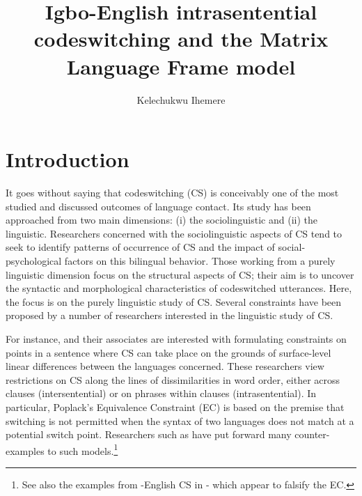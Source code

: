 \documentclass[output=paper]{langsci/langscibook}
\title{Igbo-English intrasentential codeswitching and the Matrix Language Frame model}
\author{%
 Kelechukwu Ihemere \affiliation{University of Westminster, London UK}
}
\begin{document}



 


\section{Introduction}\label{sec:ihemere:1}

It goes without saying that codeswitching (CS) is conceivably one of the most studied and discussed outcomes of language contact. Its study has been approached from two main dimensions: (i) the sociolinguistic and (ii) the linguistic. Researchers concerned with the sociolinguistic aspects of CS tend to seek to identify patterns of occurrence of CS and the impact of social-psychological factors on this bilingual behavior. Those working from a purely linguistic dimension focus on the structural aspects of CS; their aim is to uncover the syntactic and morphological characteristics of codeswitched utterances. Here, the focus is on the purely linguistic study of CS. Several constraints have been proposed by a number of researchers interested in the linguistic study of CS.  

For instance, \citet{PoplackMeechan1998} and their associates are interested with formulating constraints on points in a sentence where CS can take place on the grounds of surface-level linear differences between the languages concerned. These researchers view restrictions on CS along the lines of dissimilarities in word order, either across clauses (intersentential) or on phrases within clauses (intrasentential). In particular, Poplack’s Equivalence Constraint (EC) is based on the premise that switching is not permitted when the syntax of two languages does not match at a potential switch point. Researchers such as \citet{Bhatt2001} have put forward many counter-examples to such models.\footnote{See also the examples from -English CS in - which appear to falsify the EC.} 
\end{document}
